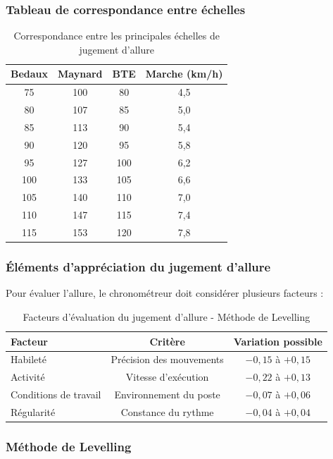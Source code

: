 \documentclass[a4paper,12pt]{article}
\begin{document}
\subsubsection{Tableau de correspondance entre échelles}

\begin{table}[ht]
\centering
\begin{tabular}{|c|c|c|c|}
\hline
\textbf{Bedaux} & \textbf{Maynard} & \textbf{BTE} & \textbf{Marche (km/h)} \\
\hline
75 & 100 & 80 & 4,5 \\
80 & 107 & 85 & 5,0 \\
85 & 113 & 90 & 5,4 \\
90 & 120 & 95 & 5,8 \\
95 & 127 & 100 & 6,2 \\
100 & 133 & 105 & 6,6 \\
105 & 140 & 110 & 7,0 \\
110 & 147 & 115 & 7,4 \\
115 & 153 & 120 & 7,8 \\
\hline
\end{tabular}
\caption{Correspondance entre les principales échelles de jugement d'allure}
\end{table}

\subsubsection{Éléments d'appréciation du jugement d'allure}

Pour évaluer l'allure, le chronométreur doit considérer plusieurs facteurs :

\begin{table}[ht]
\centering
\begin{tabular}{|l|c|c|}
\hline
\textbf{Facteur} & \textbf{Critère} & \textbf{Variation possible} \\
\hline
Habileté & Précision des mouvements & $-0,15$ à $+0,15$ \\
Activité & Vitesse d'exécution & $-0,22$ à $+0,13$ \\
Conditions de travail & Environnement du poste & $-0,07$ à $+0,06$ \\
Régularité & Constance du rythme & $-0,04$ à $+0,04$ \\
\hline
\end{tabular}
\caption{Facteurs d'évaluation du jugement d'allure - Méthode de Levelling}
\end{table}

\subsubsection{Méthode de Levelling}
\end{document}
